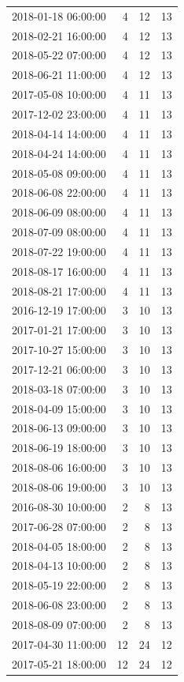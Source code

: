 \begin{tabular}{lrrr}
2018-01-18 06:00:00 & 4 & 12 & 13 \\
2018-02-21 16:00:00 & 4 & 12 & 13 \\
2018-05-22 07:00:00 & 4 & 12 & 13 \\
2018-06-21 11:00:00 & 4 & 12 & 13 \\
2017-05-08 10:00:00 & 4 & 11 & 13 \\
2017-12-02 23:00:00 & 4 & 11 & 13 \\
2018-04-14 14:00:00 & 4 & 11 & 13 \\
2018-04-24 14:00:00 & 4 & 11 & 13 \\
2018-05-08 09:00:00 & 4 & 11 & 13 \\
2018-06-08 22:00:00 & 4 & 11 & 13 \\
2018-06-09 08:00:00 & 4 & 11 & 13 \\
2018-07-09 08:00:00 & 4 & 11 & 13 \\
2018-07-22 19:00:00 & 4 & 11 & 13 \\
2018-08-17 16:00:00 & 4 & 11 & 13 \\
2018-08-21 17:00:00 & 4 & 11 & 13 \\
2016-12-19 17:00:00 & 3 & 10 & 13 \\
2017-01-21 17:00:00 & 3 & 10 & 13 \\
2017-10-27 15:00:00 & 3 & 10 & 13 \\
2017-12-21 06:00:00 & 3 & 10 & 13 \\
2018-03-18 07:00:00 & 3 & 10 & 13 \\
2018-04-09 15:00:00 & 3 & 10 & 13 \\
2018-06-13 09:00:00 & 3 & 10 & 13 \\
2018-06-19 18:00:00 & 3 & 10 & 13 \\
2018-08-06 16:00:00 & 3 & 10 & 13 \\
2018-08-06 19:00:00 & 3 & 10 & 13 \\
2016-08-30 10:00:00 & 2 & 8 & 13 \\
2017-06-28 07:00:00 & 2 & 8 & 13 \\
2018-04-05 18:00:00 & 2 & 8 & 13 \\
2018-04-13 10:00:00 & 2 & 8 & 13 \\
2018-05-19 22:00:00 & 2 & 8 & 13 \\
2018-06-08 23:00:00 & 2 & 8 & 13 \\
2018-08-09 07:00:00 & 2 & 8 & 13 \\
2017-04-30 11:00:00 & 12 & 24 & 12 \\
2017-05-21 18:00:00 & 12 & 24 & 12 \\

\end{tabular}
